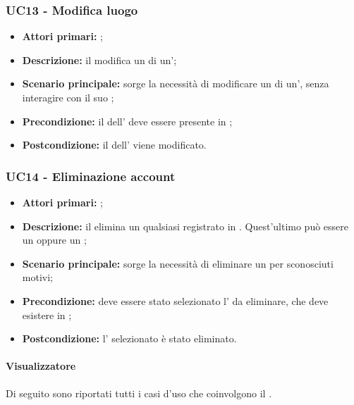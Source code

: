 \documentclass[casi-duso]{subfiles}
\begin{document}
\subsubsection{UC13 - Modifica luogo}
\label{subsub:UC13}

\begin{itemize}
  \item \textbf{Attori primari:} ;
  \item \textbf{Descrizione:} il  modifica un  di un';
  \item \textbf{Scenario principale:} sorge la necessità di modificare un  di un', senza interagire con il suo ;
  \item \textbf{Precondizione:} il  dell' deve essere presente in ;
  \item \textbf{Postcondizione:} il  dell' viene modificato.

\end{itemize}

\subsubsection{UC14 - Eliminazione account}
\label{subsub:UC14}

\begin{itemize}
  \item \textbf{Attori primari:} ;
  \item \textbf{Descrizione:} il  elimina un qualsiasi  registrato in . Quest'ultimo può essere un  oppure un ;
  \item \textbf{Scenario principale:} sorge la necessità di eliminare un  per sconosciuti motivi;
  \item \textbf{Precondizione:} deve essere stato selezionato l' da eliminare, che deve esistere in ;
  \item \textbf{Postcondizione:} l' selezionato è stato eliminato.

\end{itemize}



\paragraph{Visualizzatore}
Di seguito sono riportati tutti i casi d'uso che coinvolgono il  .
\end{document}
